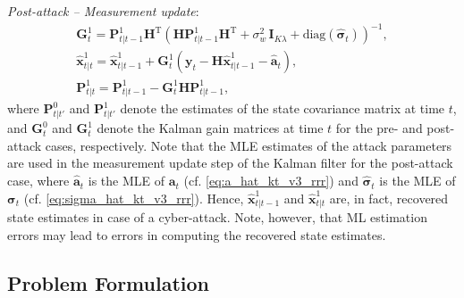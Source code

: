 \documentclass[onecolumn]{IEEEtran}
\begin{document}
\emph{Post-attack -- Measurement update}:
\begin{gather} \nonumber
\mathbf{G}_{t}^1 = \mathbf{P}_{t|t-1}^1 \mathbf{H}^\mathrm{T} (\mathbf{H} \mathbf{P}_{t|t-1}^1 \mathbf{H}^\mathrm{T} + \sigma_w^2 \, \mathbf{I}_{K \lambda} + \mathrm{diag}(\hat{\pmb{\sigma}}_t))^{-1}, \\ \nonumber
\hat{\mathbf{x}}_{t|t}^1 = \hat{\mathbf{x}}_{t|t-1}^1 + \mathbf{G}_{t}^1 (\mathbf{y}_t - \mathbf{H} \hat{\mathbf{x}}_{t|t-1}^1 - \hat{\mathbf{a}}_t), \\ \label{eq:meas_upd_fdata_alter}
\mathbf{P}_{t|t}^1 = \mathbf{P}_{t|t-1}^1 - \mathbf{G}_{t}^1 \mathbf{H} \mathbf{P}_{t|t-1}^1,
\end{gather}
where $\mathbf{P}_{t|t'}^0$ and $\mathbf{P}_{t|t'}^1$ denote the estimates of the state covariance matrix at time $t$, and $\mathbf{G}_{t}^0$ and $\mathbf{G}_{t}^1$ denote the Kalman gain matrices at time $t$ for the pre- and post-attack cases, respectively. Note that the MLE estimates of the attack parameters are used in the measurement update step of the Kalman filter for the post-attack case, where $\hat{\mathbf{a}}_t$ is the MLE of $\mathbf{a}_t$ (cf. \eqref{eq:a_hat_kt_v3_rrr}) and $\hat{\pmb{\sigma}}_t$ is the MLE of $\pmb{\sigma}_t$ (cf. \eqref{eq:sigma_hat_kt_v3_rrr}). Hence, $\hat{\mathbf{x}}_{t|t-1}^1$ and $\hat{\mathbf{x}}_{t|t}^1$ are, in fact, recovered state estimates in case of a cyber-attack. Note, however, that ML estimation errors may lead to errors in computing the recovered state estimates.


\subsection{Problem Formulation}
\end{document}
